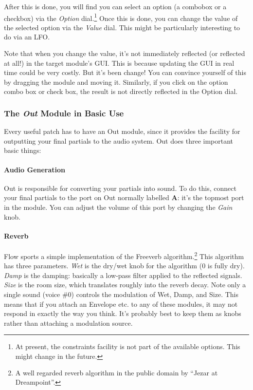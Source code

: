 \documentclass{article}
\begin{document}
After this is done, you will find you can select an option (a combobox or a checkbox) via the {\it Option} dial.\footnote{At present, the constraints facility is not part of the available options.  This might change in the future.} Once this is done, you can change the value of the selected option via the {\it Value} dial.  This might be particularly interesting to do via an LFO.

Note that when you change the value, it's not immediately reflected (or reflected at all!) in the target module's GUI.  This is because updating the GUI in real time could be very costly.  But it's been change!  You can convince yourself of this by dragging the module and moving it.  Similarly, if you click on the option combo box or check box, the result is not directly reflected in the Option dial.

\subsubsection{The \textit{Out} Module in Basic Use}  
\label{outmodule}

Every useful patch has to have an Out module, since it provides the facility for outputting your final partials to the audio system.  Out does three important basic things:

\paragraph{Audio Generation}  Out is responsible for converting your partials into sound.  To do this, connect your final partials to the port on Out normally labelled {\bf A}: it's the topmost port in the module.  You can adjust the volume of this port by changing the {\it Gain} knob.

\paragraph{Reverb} Flow sports a simple implementation of the Freeverb algorithm.\footnote{A well regarded reverb algorithm in the public domain by ``Jezar at Dreampoint''.}  This algorithm has three parameters.  {\it Wet} is the dry/wet knob for the algorithm (0 is fully dry).  {\it Damp} is the damping: basically a low-pass filter applied to the reflected signals.  {\it Size} is the room size, which translates roughly into the reverb decay.  Note only a single sound (voice \#0) controls the modulation of Wet, Damp, and Size.  This means that if you attach an Envelope etc. to any of these modules, it may not respond in exactly the way you think.  It's probably best to keep them as knobs rather than attaching a modulation source.
\end{document}

